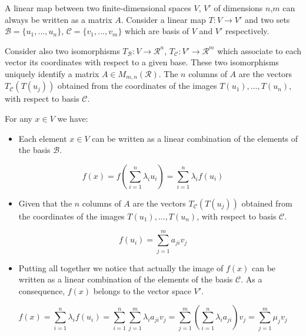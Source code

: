 
A linear map between two finite-dimensional spaces $V$, $V'$ of dimensions $n$,$m$ can always be written as a matrix $A$. Consider a linear map $T: V \rightarrow V'$ and two sets $\mathcal{B}=\{u_1,...,u_n\}$, $\mathcal{C}=\{v_1,...,v_m\}$ which are basis of $V$ and $V'$ respectively.

Consider also two isomorphisms $T_{\mathcal{B}}: V \rightarrow {\mathcal{R}}^{n}$, $T_{\mathcal{C}}: V' \rightarrow {\mathcal{R}}^{m}$ which associate to each vector its coordinates with respect to a given base. These two isomorphisms uniquely identify a matrix $A \in M_{m,n}(\mathcal{R})$. The $n$ columns of $A$ are the vectors $T_{\mathcal{C}}(T(u_j))$ obtained from the coordinates of the images $T(u_1),...,T(u_n)$, with respect to basis $\mathcal{C}$.

For any $x \in V$ we have:
\begin{itemize}
    \item Each element $x \in V$ can be written as a linear combination of the elements of the basis $\mathcal{B}$.
\end{itemize}
\begin{equation*}
    f(x) = f(\sum_{i=1}^n \lambda_i u_i) = \sum_{i=1}^n \lambda_i f(u_i)
\end{equation*}
\begin{itemize}
    \item Given that the $n$ columns of $A$ are the vectors $T_{\mathcal{C}}(T(u_j))$ obtained from the coordinates of the images $T(u_1),...,T(u_n)$, with respect to basis $\mathcal{C}$.
\end{itemize}
\begin{equation*}
    f(u_i) = \sum_{j=1}^m a_{ji}v_j
\end{equation*}
\begin{itemize}
    \item Putting all together we notice that actually the image of $f(x)$ can be written as a linear combination of the elements of the basis $\mathcal{C}$. As a consequence, $f(x)$ belongs to the vector space $V'$.
\end{itemize}
\begin{equation*}
    f(x) = \sum_{i=1}^n \lambda_i f(u_i) = \sum_{i=1}^n \sum_{j=1}^m \lambda_i a_{ji} v_j = \sum_{j=1}^m (\sum_{i=1}^n \lambda_i a_{ji}) v_j = \sum_{j=1}^m \mu_j v_j
\end{equation*}

